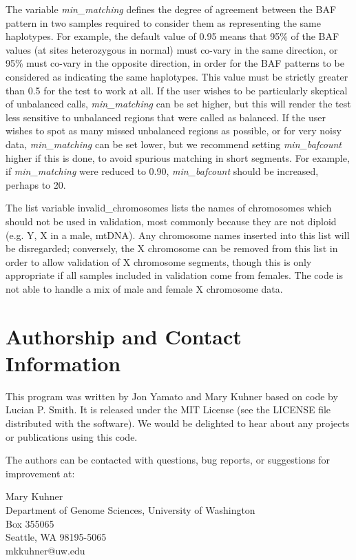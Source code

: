 \documentclass{article}
\begin{document}
The variable {\it min\_matching} defines the degree of agreement between
the BAF pattern in two samples required to consider them as
representing the same haplotypes.  For example, the default value
of 0.95 means that 95\% of the BAF values (at sites heterozygous
in normal) must co-vary in the same direction, or 95\% must co-vary
in the opposite direction, in order for the BAF patterns to be
considered as indicating the same haplotypes.  This value must be
strictly greater than 0.5 for the test to work at all.  If the user
wishes to be particularly skeptical of unbalanced calls, {\it min\_matching}
can be set higher, but this will render the test less sensitive to 
unbalanced regions that were called as balanced.  If the user
wishes to spot as many missed unbalanced regions as possible, 
or for very noisy data, {\it min\_matching} can be set lower, but
we recommend setting {\it min\_bafcount} higher if this is done,
to avoid spurious matching in short segments.  For example, if
{\it min\_matching} were reduced to 0.90, {\it min\_bafcount} should
be increased, perhaps to 20.

The list variable invalid\_chromosomes lists the names of
chromosomes which should not be used in validation, most commonly
because they are not diploid (e.g. Y, X in a male, mtDNA).  Any
chromosome names inserted into this list will be disregarded;
conversely, the X chromosome can be removed from this list in order
to allow validation of X chromosome segments, though this is only
appropriate if all samples included in validation come from
females.  The code is not able to handle a mix of male and female
X chromosome data.

\section*{Authorship and Contact Information}

This program was written by Jon Yamato and Mary Kuhner based on
code by Lucian P. Smith.  It is released under the MIT License (see
the LICENSE file distributed with the software).
We would be delighted to hear about any projects or publications using
this code.

The authors can be contacted with questions, bug reports, or
suggestions for improvement at:

{\flushleft
Mary Kuhner \\
Department of Genome Sciences, University of Washington \\
Box 355065 \\
Seattle, WA 98195-5065 \\
mkkuhner@uw.edu \\
}
\end{document}
